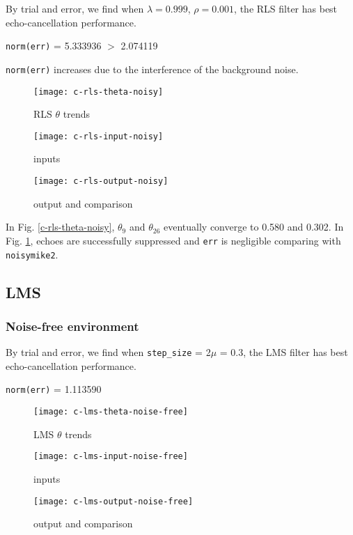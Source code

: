 \documentclass{article}
\begin{document}
By trial and error, we find when $\lambda = 0.999$, $\rho = 0.001$, the RLS filter has best echo-cancellation performance.
\begin{center}
\texttt{norm(err)} = 5.333936 $>$ 2.074119
\end{center}
\texttt{norm(err)} increases due to the interference of the background noise.

\begin{figure}[H]
\begin{minipage}[t]{0.33\linewidth}
\centering
\texttt{[image: c-rls-theta-noisy]}
\caption{RLS $\theta$ trends}
\label{c-rls-theta-noisy}
\end{minipage}
\begin{minipage}[t]{0.33\linewidth}
\centering
\texttt{[image: c-rls-input-noisy]}
\caption{inputs}
\end{minipage}
\begin{minipage}[t]{0.33\linewidth}
\centering
\texttt{[image: c-rls-output-noisy]}
\caption{output and comparison}
\label{c-rls-output-noisy}
\end{minipage}
\end{figure}

In Fig. \ref{c-rls-theta-noisy}, $\theta_9$ and $\theta_{26}$ eventually converge to 0.580 and 0.302. In Fig. \ref{c-rls-output-noisy}, echoes are successfully suppressed and \texttt{err} is negligible comparing with \texttt{noisymike2}.


\subsection*{LMS}

\subsubsection*{Noise-free environment}

By trial and error, we find when \texttt{step\_size} = 2$\mu$ = 0.3, the LMS filter has best echo-cancellation performance.
\begin{center}
\texttt{norm(err)} = 1.113590
\end{center}

\begin{figure}[H]
\begin{minipage}[t]{0.33\linewidth}
\centering
\texttt{[image: c-lms-theta-noise-free]}
\caption{LMS $\theta$ trends}
\label{c-lms-theta-noise-free}
\end{minipage}
\begin{minipage}[t]{0.33\linewidth}
\centering
\texttt{[image: c-lms-input-noise-free]}
\caption{inputs}
\end{minipage}
\begin{minipage}[t]{0.33\linewidth}
\centering
\texttt{[image: c-lms-output-noise-free]}
\caption{output and comparison}
\label{c-lms-output-noise-free}
\end{minipage}
\end{figure}
\end{document}
